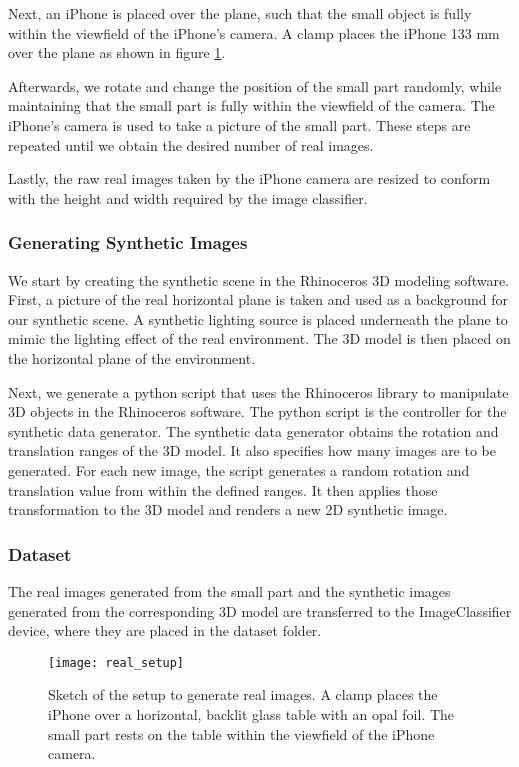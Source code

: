 Next, an iPhone is placed over the plane, such that the small object is fully within the viewfield of the iPhone's camera. A clamp places the iPhone 133 mm over the plane as shown in figure \ref{fig:RealSetup}.

Afterwards, we rotate and change the position of the small part randomly, while maintaining that the small part is fully within the viewfield of the camera. The iPhone's camera is used to take a picture of the small part. These steps are repeated until we obtain the desired number of real images.

Lastly, the raw real images taken by the iPhone camera are resized to conform with the height and width required by the image classifier.

\subsubsection{Generating Synthetic Images}
We start by creating the synthetic scene in the Rhinoceros 3D modeling software. First, a picture of the real horizontal plane is taken and used as a background for our synthetic scene. A synthetic lighting source is placed underneath the plane to mimic the lighting effect of the real environment. The 3D model is then placed on the horizontal plane of the environment.

Next, we generate a python script that uses the Rhinoceros library to manipulate 3D objects in the Rhinoceros software. The python script is the controller for the synthetic data generator. The synthetic data generator obtains the rotation and translation ranges of the 3D model. It also specifies how many images are to be generated. For each new image, the script generates a random rotation and translation value from within the defined ranges. It then applies those transformation to the 3D model and renders a new 2D synthetic image.

\subsubsection{Dataset}
The real images generated from the small part and the synthetic images generated from the corresponding 3D model are transferred to the ImageClassifier device, where they are placed in the dataset folder.

\begin{figure}[H]
\centering
  \texttt{[image: real\_setup]}
\caption{Sketch of the setup to generate real images. A clamp places the iPhone over a horizontal, backlit glass table with an opal foil. The small part rests on the table within the viewfield of the iPhone camera.}
\label{fig:RealSetup}
\end{figure}


